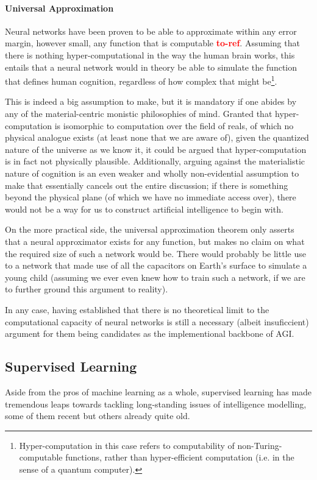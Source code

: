 \documentclass[]{article}
\newcommand\toref{\textcolor{red}{\bf{to-ref}}}
\begin{document}
\paragraph{Universal Approximation}
Neural networks have been proven to be able to approximate within any error margin, however small, any function that is computable \toref . Assuming that there is nothing hyper-computational in the way the human brain works, this entails that a neural network would in theory be able to simulate the function that defines human cognition, regardless of how complex that might be\footnote{Hyper-computation in this case refers to computability of non-Turing-computable functions, rather than hyper-efficient computation (i.e. in the sense of a quantum computer).}. 

This is indeed a big assumption to make, but it is mandatory if one abides by any of the material-centric monistic philosophies of mind. Granted that hyper-computation is isomorphic to computation over the field of reals, of which no physical analogue exists (at least none that we are aware of), given the quantized nature of the universe as we know it, it could be argued that hyper-computation is in fact not physically plausible. Additionally, arguing against the materialistic nature of cognition is an even weaker and wholly non-evidential assumption to make that essentially cancels out the entire discussion; if there is something beyond the physical plane (of which we have no immediate access over), there would not be a way for us to construct artificial intelligence to begin with.

On the more practical side, the universal approximation theorem only asserts that a neural approximator exists for any function, but makes no claim on what the required size of such a network would be. There would probably be little use to a network that made use of all the capacitors on Earth's surface to simulate a young child (assuming we ever even knew how to train such a network, if we are to further ground this argument to reality). 

In any case, having established that there is no theoretical limit to the computational capacity of neural networks is still a necessary (albeit insuficcient) argument for them being candidates as the implementional backbone of AGI.

\subsection{Supervised Learning}
Aside from the pros of machine learning as a whole, supervised learning has made tremendous leaps towards tackling long-standing issues of intelligence modelling, some of them recent but others already quite old.
\end{document}
